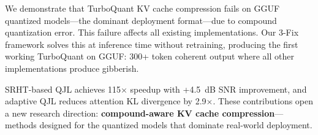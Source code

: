 \documentclass[11pt]{article}
\begin{document}
We demonstrate that TurboQuant KV cache compression fails on GGUF quantized models---the dominant deployment format---due to compound quantization error. This failure affects all existing implementations. Our 3-Fix framework solves this at inference time without retraining, producing the first working TurboQuant on GGUF: 300+ token coherent output where all other implementations produce gibberish.

SRHT-based QJL achieves 115$\times$ speedup with +4.5~dB SNR improvement, and adaptive QJL reduces attention KL divergence by 2.9$\times$. These contributions open a new research direction: \textbf{compound-aware KV cache compression}---methods designed for the quantized models that dominate real-world deployment.



\end{document}
